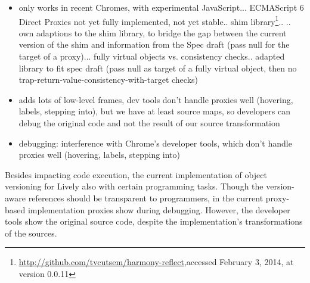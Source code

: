 \begin{itemize}
    \item only works in recent Chromes, with experimental JavaScript... ECMAScript 6 Direct Proxies not yet fully implemented, not yet stable.. shim library\footnote{\url{http://github.com/tvcutsem/harmony-reflect},\goodbreak accessed February 3, 2014, at version 0.0.11}..
.. own adaptions to the shim library, to bridge the gap between the current version of the shim and information from the Spec draft (pass null for the target of a proxy)... fully virtual objects vs. consistency checks.. adapted library to fit spec draft (pass null as target of a fully virtual object, then no trap-return-value-consistency-with-target checks)
\end{itemize}
    






\begin{itemize}
    \item adds lots of low-level frames, dev tools don’t handle proxies well (hovering, labels, stepping into), but we have at least source maps, so developers can debug the original code and not the result of our source transformation
    \item debugging: interference with Chrome's developer tools, which don’t handle proxies well (hovering, labels, stepping into)
\end{itemize}


Besides impacting code execution, the current implementation of object versioning for Lively also  with certain programming tasks.
Though the version-aware references should be transparent to programmers, in the current proxy-based implementation proxies show during debugging.
However, the developer tools show the original source code, despite the implementation's transformations of the sources.
